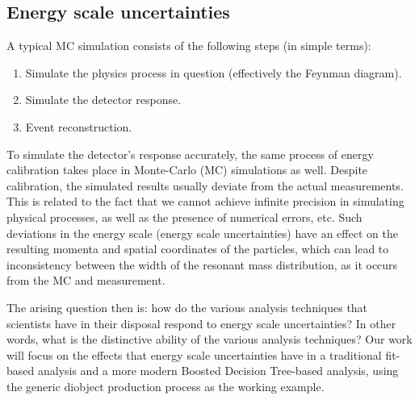 \subsection{Energy scale uncertainties}
\label{sec:org6d4b879}
A typical MC simulation consists of the following steps (in simple terms):
\begin{enumerate}
\item Simulate the physics process in question (effectively the Feynman diagram).
\item Simulate the detector response.
\item Event reconstruction.
\end{enumerate}
To simulate the detector's response accurately, the same process of energy calibration takes place in Monte-Carlo (MC) simulations as well. Despite calibration, the simulated results usually deviate from the actual measurements. This is related to the fact that we cannot achieve infinite precision in simulating physical processes, as well as the presence of numerical errors, etc. Such deviations in the energy scale (energy scale uncertainties) have an effect on the resulting momenta and spatial coordinates of the particles, which can lead to inconsistency between the width of the resonant mass distribution, as it occurs from the MC and measurement.

The arising question then is: how do the various analysis techniques that scientists have in their disposal respond to energy scale uncertainties? In other words, what is the distinctive ability of the various analysis techniques? Our work will focus on the effects that energy scale uncertainties have in a traditional fit-based analysis and a more modern Boosted Decision Tree-based analysis, using the generic diobject production process as the working example.
